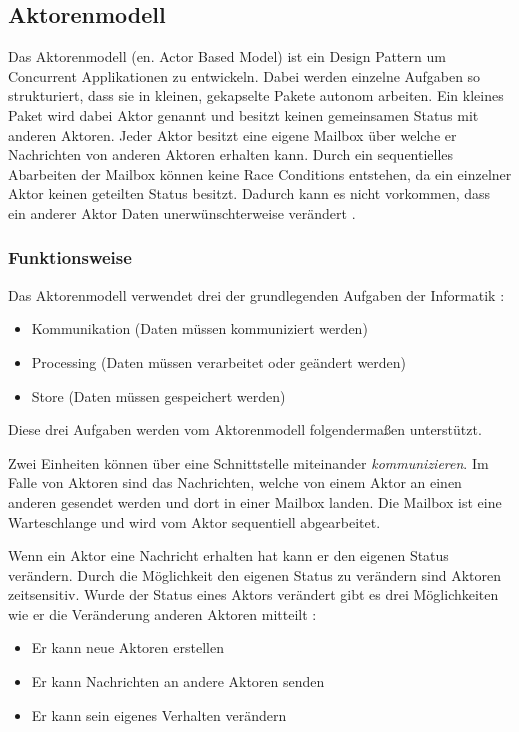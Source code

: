 \subsection{Aktorenmodell}
\label{section:Actor Based Model}

Das Aktorenmodell (en. Actor Based Model) ist ein Design Pattern um Concurrent Applikationen zu entwickeln. Dabei werden einzelne Aufgaben so strukturiert, dass sie in kleinen, gekapselte Pakete autonom arbeiten. Ein kleines Paket wird dabei Aktor genannt und besitzt keinen gemeinsamen Status mit anderen Aktoren. Jeder Aktor besitzt eine eigene Mailbox über welche er Nachrichten von anderen Aktoren erhalten kann. Durch ein sequentielles Abarbeiten der Mailbox können keine Race Conditions entstehen, da ein einzelner Aktor keinen geteilten Status besitzt. Dadurch kann es nicht vorkommen, dass ein anderer Aktor Daten unerwünschterweise verändert \cite[p. 84]{Erb2012}. 

\subsubsection{Funktionsweise}

Das Aktorenmodell verwendet drei der grundlegenden Aufgaben der Informatik \cite[p. 85]{Erb2012}:

\begin{itemize}
  \item Kommunikation (Daten müssen kommuniziert werden)
  \item Processing (Daten müssen verarbeitet oder geändert werden)
  \item Store (Daten müssen gespeichert werden)
\end{itemize}

Diese drei Aufgaben werden vom Aktorenmodell folgendermaßen unterstützt.

Zwei Einheiten können über eine Schnittstelle miteinander \emph{kommunizieren}. Im Falle von Aktoren sind das Nachrichten, welche von einem Aktor an einen anderen gesendet werden und dort in einer Mailbox landen. Die Mailbox ist eine Warteschlange und wird vom Aktor sequentiell abgearbeitet. 

Wenn ein Aktor eine Nachricht erhalten hat kann er den eigenen Status verändern. Durch die Möglichkeit den eigenen Status zu verändern sind Aktoren zeitsensitiv. Wurde der Status eines Aktors verändert gibt es drei Möglichkeiten wie er die Veränderung anderen Aktoren mitteilt \cite[p. 84]{Erb2012}:

\begin{itemize}
  \item Er kann neue Aktoren erstellen
  \item Er kann Nachrichten an andere Aktoren senden
  \item Er kann sein eigenes Verhalten verändern
\end{itemize}

